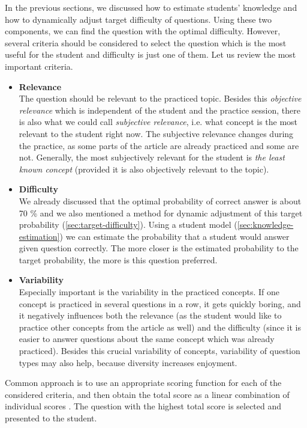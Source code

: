\documentclass[12pt, twoside]{fithesis2}		%
\renewcommand{\_}{\leavevmode \kern0.07em\vbox{\hrule width0.4em}}
\newcommand{\squarebullet}{\textcolor{black}{\raisebox{0.15em}{\rule{4pt}{4pt}}}}
\newcommand{\emptysquarebullet}{\textcolor{black}{\raisebox{0.10em}{\tiny$\square$}}}
\newenvironment{myItemize}{
  \begin{itemize}[leftmargin=2em,rightmargin=1em,itemsep=\parskip ,parsep=0em,topsep=0em,partopsep=0em]
  \renewcommand{\labelitemi}{\squarebullet}
  \renewcommand{\labelitemii}{\textbullet}
}{
  \end{itemize}
}
\begin{document}
In the previous sections, we discussed how to estimate students' knowledge and how to dynamically adjust target difficulty of questions.
Using these two components, we can find the question with the optimal difficulty.
However, several criteria should be considered to select the question which is the most useful for the student and difficulty is just one of them. Let us review the most important criteria.
\begin{myItemize}
  \item \textbf{Relevance}\\
    The question should be relevant to the practiced topic.
    Besides this \emph{objective relevance} which is independent of the student and the practice session,
    there is also what we could call \emph{subjective relevance}, i.e. what concept is the most relevant to the student right now.
    The subjective relevance changes during the practice, as some parts of the article are already practiced and some are not.
    Generally, the most subjectively relevant for the student is
    \emph{the least known concept} \cite{question-gen-adapt-bayes}
    (provided it is also objectively relevant to the topic).

  \item \textbf{Difficulty}\\
    We already discussed that the optimal probability of correct answer is about 70 \% and we also mentioned a method for dynamic adjustment of this target probability (\autoref{sec:target-difficulty}).
    Using a student model (\autoref{sec:knowledge-estimation}) we can estimate the probability that a student would answer given question correctly.
    The more closer is the estimated probability to the target probability, the more is this question preferred.

  \item \textbf{Variability}\\
    Especially important is the variability in the practiced concepts.
    If one concept is practiced in several questions in a row, it gets quickly boring, and it negatively influences both the relevance (as the student would like to practice other concepts from the article as well) and the difficulty (since it is easier to answer questions about the same concept which was already practiced).
    Besides this crucial variability of concepts,
    variability of question types may also help, because diversity increases enjoyment.
\end{myItemize}
Common approach is to use an appropriate scoring function for each of the considered criteria, and then obtain the total score as a linear combination of individual scores \cite{slepe-mapy}.
The question with the highest total score is selected and presented to the student.
\end{document}
